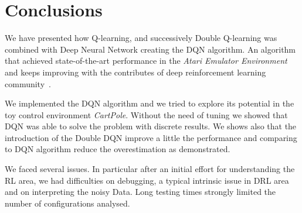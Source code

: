 \section{Conclusions}

We have presented how Q-learning, and successively Double Q-learning was combined with Deep Neural Network creating the DQN algorithm. 
An algorithm that achieved state-of-the-art performance in the \textit{Atari Emulator Environment} and keeps improving with the contributes of deep reinforcement learning community~\cite{DBLP:journals/corr/abs-1710-02298}.

We implemented the DQN algorithm and we tried to explore its potential in the toy control environment \textit{CartPole}. Without the need of tuning we showed that DQN was able to solve the problem with discrete results. We shows also that the introduction of the Double DQN improve a little the performance and comparing to DQN algorithm reduce the overestimation as \citeauthor{Hasselt:2016:DRL:3016100.3016191}  demonstrated.

We faced several issues. In particular after an initial effort for understanding the RL area, we had difficulties on debugging, a typical intrinsic issue in DRL area~\cite{rlblogpost} and on interpreting the noisy Data. Long testing times strongly limited the number of configurations analysed.







